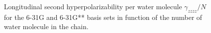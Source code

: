 \documentclass[prl,aps,twocolumn,showpacs,twocolumngrid,superbib]{revtex4}
\begin{document}
\begin{figure}[t]
  \caption{\protect
    Longitudinal second hyperpolarizability per water
    molecule $\gamma_{zzzz}/N$ for 
    the 6-31G and 6-31G** basis sets in function
    of the number of water molecule in the chain.
  }\label{fig:Gamma_1D}
\end{figure}
\end{document}

